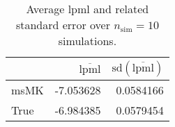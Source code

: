 \begin{table}[H]

\caption{Average lpml and related standard error over $n_{\text{sim}} = 10$ simulations.}
\centering
\begin{tabular}[t]{lrr}
\toprule
  & $\overbar{\text{lpml}}$ & $\text{sd}(\overbar{\text{lpml}})$\\
\midrule
msMK & -7.053628 & 0.0584166\\
True & -6.984385 & 0.0579454\\
\bottomrule
\end{tabular}
\end{table}